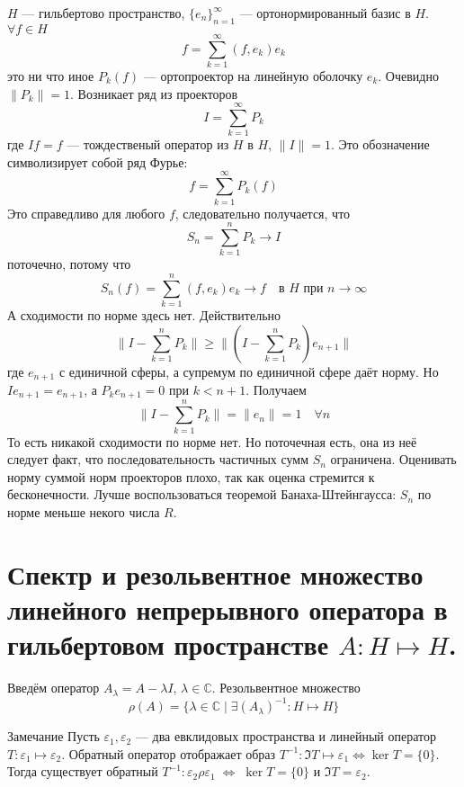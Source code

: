 \documentclass[14pt]{extarticle}
\begin{document}
\begin{Prim}
    $H$ --- гильбертово пространство, $\{e_n\}_{n = 1}^{\infty}$ --- ортонормированный базис в $H$.
    $\forall f \in H$
    $$
     f = \sum\limits_{k = 1}^{\infty}(f, e_k)e_k
    $$ 
    это ни что иное $P_k(f)$ --- ортопроектор на линейную оболочку $e_k$.
    Очевидно $\|P_k\| = 1$.
    Возникает ряд из проекторов 
    $$
    I = \sum\limits_{k = 1}^{\infty}P_k
    $$
    где $If = f$ --- тождественый оператор из $H$ в $H$, $\|I\| = 1$.
    Это обозначение символизирует собой ряд Фурье:
    $$
    f = \sum\limits_{k = 1}^{\infty}P_k(f)
    $$
    Это справедливо для любого $f$, следовательно получается, что 
    $$
    S_n = \sum\limits_{k = 1}^{n}P_k \to I
    $$ поточечно, потому что
    $$
    S_n(f) = \sum\limits_{k = 1}^{n}(f, e_k)e_k \to f \quad \text{в }H \text{ при } n \to \infty
    $$
    А сходимости по норме здесь нет.
    Действительно 
    $$
    \|I - \sum\limits_{k = 1}^{n}P_k\| \ge \|(I - \sum\limits_{k = 1}^{n}P_k)e_{n + 1}\|
    $$
    где $e_{n+  1}$ с единичной сферы, а супремум по единичной сфере даёт норму.
    Но $Ie_{n + 1} = e_{n + 1}$, а $P_k e_{n + 1} = 0$ при $k < n + 1$.
    Получаем 
    $$
    \|I - \sum\limits_{k = 1}^{n}P_k\| = \|e_n\| = 1\quad \forall n
    $$
    То есть никакой сходимости по норме нет.
    Но поточечная есть, она из неё следует факт, что последовательность частичных сумм $S_n$ ограничена.
    Оценивать норму суммой норм проекторов плохо, так как оценка стремится к бесконечности.
    Лучше воспользоваться теоремой Банаха-Штейнгаусса: $S_n$ по норме меньше некого числа $R$.
\end{Prim}

\section*{Спектр и резольвентное множество линейного непрерывного оператора в гильбертовом пространстве $A : H \mapsto H$.}

Введём оператор $A_\lambda = A - \lambda I$, $\lambda \in \mathbb C$.
Резольвентное множество 
$$
\rho(A) = \{\lambda \in \mathbb C \mid \exists (A_\lambda)^{-1} : H \mapsto H\}
$$

\begin{MathCl}{Замечание}
    Пусть $\varepsilon_1, \varepsilon_2$ --- два евклидовых пространства и линейный оператор $T : \varepsilon_1 \mapsto \varepsilon_2$.
    Обратный оператор отображает образ $T^{-1} : \Im T \mapsto \varepsilon_1 \Leftrightarrow \ker T = \{0\}$.
    Тогда существует обратный $T^{-1}:\varepsilon_2 \rho \varepsilon_1\; \Leftrightarrow\; \ker T = \{0\}$ и $\Im T = \varepsilon_2$.
\end{MathCl}
\end{document}
